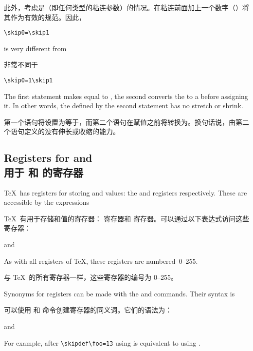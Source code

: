 此外，考虑是（即任何类型的粘连参数）的情况。在粘连前面加上一个数字（）将其作为有效的规范。因此，
\begin{verbatim}
\skip0=\skip1
\end{verbatim}
is very different
from 

非常不同于\begin{verbatim}
\skip0=1\skip1
\end{verbatim}
The first statement makes
 equal to , the second converts
the  to a  before assigning it.
In other words, the  defined by the second statement
has no stretch or shrink.

第一个语句将设置为等于，而第二个语句在赋值之前将转换为。换句话说，由第二个语句定义的没有伸长或收缩的能力。


\subsection{Registers for  and \\用于  和  的寄存器}

\TeX\ has registers for storing  and 
values: the  and  registers
respectively. These are accessible by the expressions

\TeX\ 有用于存储和值的寄存器： 寄存器和  寄存器。可以通过以下表达式访问这些寄存器：
\begin{disp}\end{disp} and
\begin{disp}\end{disp}
As with all registers of \TeX, these registers are
numbered~0--255.

与 \TeX\ 的所有寄存器一样，这些寄存器的编号为 0--255。

Synonyms for registers can be made with the  and
 commands. Their syntax is

可以使用  和  命令创建寄存器的同义词。它们的语法为：
\begin{Disp}
\end{Disp}
and 
\begin{Disp}\end{Disp}
For example, after \verb-\skipdef\foo=13- using 
is equivalent to using .

